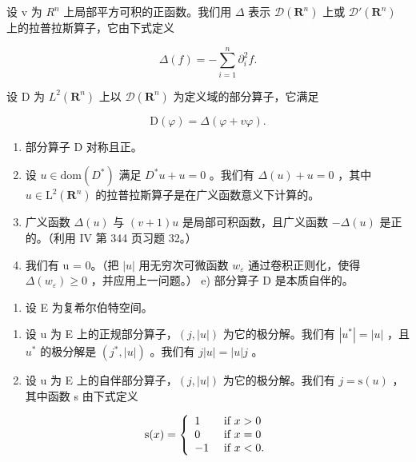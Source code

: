 设 v 为 \(R^{n}\) 上局部平方可积的正函数。我们用 \(\Delta\) 表示 \(\mathcal{D}(\mathbf{R}^{n})\) 上或 \(\mathcal{D}'(\mathbf{R}^{n})\) 上的拉普拉斯算子，它由下式定义

\[
\Delta (f) = - \sum_ {i = 1} ^ {n} \partial_ {i} ^ {2} f.
\]

设 D 为 \(L^{2}(\mathbf{R}^{n})\) 上以 \(\mathcal{D}(\mathbf{R}^{n})\) 为定义域的部分算子，它满足

\[
\mathrm{D} (\varphi) = \Delta (\varphi + v \varphi).
\]

\begin{enumerate}
\def\labelenumi{\alph{enumi})}
\item
  部分算子 D 对称且正。
\item
  设 \(u \in \text{dom}(D^{*})\) 满足 \(D^{*}u + u = 0\) 。我们有 \(\Delta(u) + u = 0\) ，其中 \(u \in \text{L}^{2}(\mathbf{R}^{n})\) 的拉普拉斯算子是在广义函数意义下计算的。
\item
  广义函数 \(\Delta(u)\) 与 \((v+1)u\) 是局部可积函数，且广义函数 \(-\Delta(u)\) 是正的。（利用 IV 第 344 页习题 32。）
\item
  我们有 u = 0。（把 \(|u|\) 用无穷次可微函数 \(w_{\varepsilon}\) 通过卷积正则化，使得 \(\Delta(w_{\varepsilon}) \geqslant 0\) ，并应用上一问题。） e) 部分算子 D 是本质自伴的。
\end{enumerate}

\begin{enumerate}
\def\labelenumi{\arabic{enumi})}
\setcounter{enumi}{39}
\tightlist
\item
  设 E 为复希尔伯特空间。
\end{enumerate}

\begin{enumerate}
\def\labelenumi{\alph{enumi})}
\item
  设 u 为 E 上的正规部分算子，\((j, |u|)\) 为它的极分解。我们有 \(|u^{*}| = |u|\) ，且 \(u^{*}\) 的极分解是 \((j^{*}, |u|)\) 。我们有 \(j|u| = |u|j\) 。
\item
  设 u 为 E 上的自伴部分算子，\((j, |u|)\) 为它的极分解。我们有 \(j = \mathrm{s}(u)\) ，其中函数 s 由下式定义
\end{enumerate}

\[
\mathrm{s} (x) = \left\{ \begin{array}{l l} 1 & \text { if } x > 0 \\ 0 & \text { if } x = 0 \\ - 1 & \text { if } x <   0. \end{array} \right.
\]

